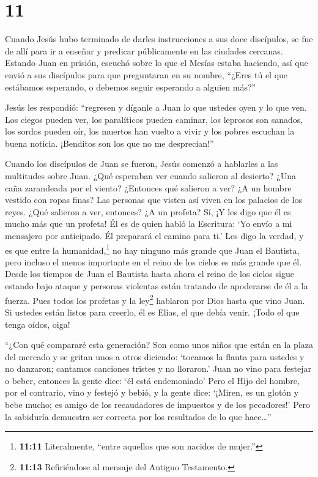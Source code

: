 \hypertarget{section-10}{%
\section{11}\label{section-10}}

 Cuando Jesús hubo terminado de darles instrucciones a sus
doce discípulos, se fue de allí para ir a enseñar y predicar
públicamente en las ciudades cercanas.  Estando Juan en
prisión, escuchó sobre lo que el Mesías estaba haciendo, así que envió a
sus discípulos  para que preguntaran en su nombre, ``¿Eres
tú el que estábamos esperando, o debemos seguir esperando a alguien
más?''

 Jesús les respondió: ``regresen y díganle a Juan lo que
ustedes oyen y lo que ven.  Los ciegos pueden ver, los
paralíticos pueden caminar, los leprosos son sanados, los sordos pueden
oír, los muertos han vuelto a vivir y los pobres escuchan la buena
noticia.  ¡Benditos son los que no me desprecian!''

 Cuando los discípulos de Juan se fueron, Jesús comenzó a
hablarles a las multitudes sobre Juan. ¿Qué esperaban ver cuando
salieron al desierto? ¿Una caña zarandeada por el viento? 
¿Entonces qué salieron a ver? ¿A un hombre vestido con ropas finas? Las
personas que visten así viven en los palacios de los reyes. 
¿Qué salieron a ver, entonces? ¿A un profeta? Sí, ¡Y les digo que él es
mucho más que un profeta!  Él es de quien habló la
Escritura: `Yo envío a mi mensajero por anticipado. Él preparará el
camino para ti.'  Les digo la verdad, y es que entre la
humanidad,\footnote{\textbf{11:11} Literalmente, ``entre aquellos que
  son nacidos de mujer.''} no hay ninguno más grande que Juan el
Bautista, pero incluso el menos importante en el reino de los cielos es
más grande que él.  Desde los tiempos de Juan el Bautista
hasta ahora el reino de los cielos sigue estando bajo ataque y personas
violentas están tratando de apoderarse de él a la fuerza. 
Pues todos los profetas y la ley\footnote{\textbf{11:13} Refiriéndose al
  mensaje del Antiguo Testamento.} hablaron por Dios hasta que vino
Juan.  Si ustedes están listos para creerlo, él es Elías,
el que debía venir.  ¡Todo el que tenga oídos, oiga!

 ``¿Con qué compararé esta generación? Son como unos niños
que están en la plaza del mercado y se gritan unos a otros diciendo:
 `tocamos la flauta para ustedes y no danzaron; cantamos
canciones tristes y no lloraron.'  Juan no vino para
festejar o beber, entonces la gente dice: `él está endemoniado'
 Pero el Hijo del hombre, por el contrario, vino y festejó
y bebió, y la gente dice: `¡Miren, es un glotón y bebe mucho; es amigo
de los recaudadores de impuestos y de los pecadores!' Pero la sabiduría
demuestra ser correcta por los resultados de lo que hace\ldots{}''

